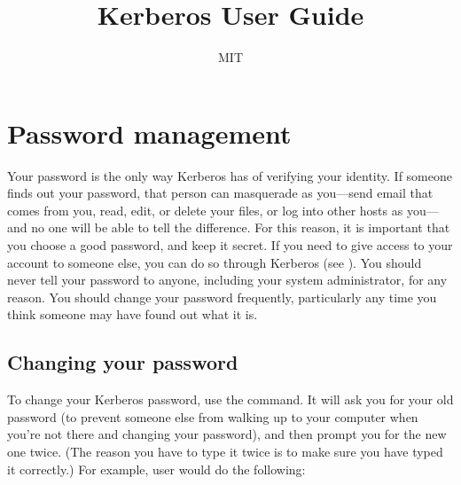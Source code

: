 \documentclass[letterpaper,10pt,english]{sphinxmanual}
\title{Kerberos User Guide}
\date{ }
\author{MIT}
\begin{document}
\maketitle
\sphinxtableofcontents
{}\label{\detokenize{user/index::doc}}



\chapter{Password management}
\label{\detokenize{user/pwd_mgmt:for-users}}\label{\detokenize{user/pwd_mgmt::doc}}\label{\detokenize{user/pwd_mgmt:password-management}}
Your password is the only way Kerberos has of verifying your identity.
If someone finds out your password, that person can masquerade as
you—send email that comes from you, read, edit, or delete your files,
or log into other hosts as you—and no one will be able to tell the
difference.  For this reason, it is important that you choose a good
password, and keep it secret.  If you need to give access to your
account to someone else, you can do so through Kerberos (see
{\hyperref[\detokenize{user/pwd_mgmt:grant-access}]{}}).  You should never tell your password to anyone,
including your system administrator, for any reason.  You should
change your password frequently, particularly any time you think
someone may have found out what it is.


\section{Changing your password}
\label{\detokenize{user/pwd_mgmt:changing-your-password}}
To change your Kerberos password, use the {\hyperref[\detokenize{user/user_commands/kpasswd:kpasswd-1}]{}} command.
It will ask you for your old password (to prevent someone else from
walking up to your computer when you’re not there and changing your
password), and then prompt you for the new one twice.  (The reason you
have to type it twice is to make sure you have typed it correctly.)
For example, user  would do the following:

%
\begin{sphinxVerbatim}[commandchars=\\\{\}]
 
          
          
         
 
\end{sphinxVerbatim}
\end{document}
